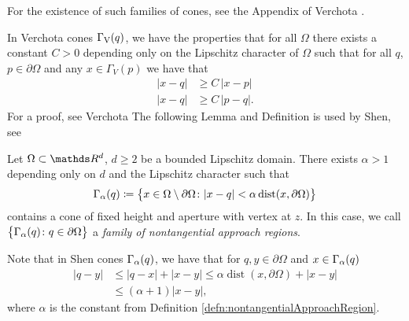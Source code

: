 For the existence of such families of cones, see the Appendix of Verchota \cite{verchota}.

In Verchota cones $\Gamma_\mathrm{V}(q)$, we have the properties that for all $\Omega$ there exists a constant $C > 0$ depending only on the Lipschitz character of $\Omega$ such that for all $q$, $p \in \partial\Omega$ and any $x \in \Gamma_V(p)$ we have that
\begin{align}
  |x - q| &\geq C\, |x - p| \label{eq:verCone1}\\ 
  |x - q| &\geq C\, |p - q|.\label{eq:verCone2}
\end{align}
For a proof, see Verchota \cite[p.\@~9f.]{verchota}
The following Lemma and Definition is used by Shen, see \cite[p.\@174]{Shen2017}

\begin{lemDefn}
  \label{defn:nontangentialApproachRegion}
  Let $\Omega \subset \R^d$, $d \geq 2$ be a bounded Lipschitz domain.
  There exists $\alpha > 1$ depending only on $d$ and the Lipschitz character such that
  \begin{align*}
     \Gamma_\alpha(q) \coloneqq \big\{ x \in \Omega \setminus \partial\Omega \colon |x - q| < \alpha \operatorname{dist}(x, \partial\Omega) \big\}
  \end{align*}
  contains a cone of fixed height and aperture with vertex at $z$.
   In this case, we call $\big\{ \Gamma_\alpha(q) \colon q \in \partial\Omega\big\}$ a \emph{family of nontangential approach regions}.
\end{lemDefn}

  Note that in Shen cones $\Gamma_\alpha(q)$, we have that for $q, y \in \partial\Omega$ and $x \in \Gamma_\alpha(q)$
\begin{align}
  \label{eq:shenConeEstimate}
  |q - y| 
  &\leq |q - x| + |x - y| 
  \leq \alpha \operatorname{dist}(x, \partial\Omega) + |x - y|  \nonumber\\
  &\leq (\alpha + 1) |x - y|,
\end{align}
where $\alpha$ is the constant from Definition \ref{defn:nontangentialApproachRegion}. 

